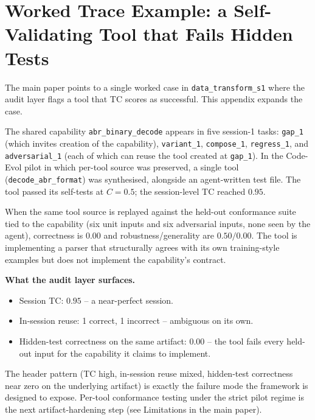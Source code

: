 \documentclass[sigconf,anonymous,review,natbib=false]{acmart}
\begin{document}
\section{Worked Trace Example: a Self-Validating Tool that Fails Hidden Tests}
\label{app:trace}

The main paper points to a single worked case in
\texttt{data\_transform\_s1} where the audit layer flags a tool that
TC scores as successful. This appendix expands the case.

The shared capability \texttt{abr\_binary\_decode} appears in five
session-1 tasks: \texttt{gap\_1} (which invites creation of the
capability), \texttt{variant\_1}, \texttt{compose\_1},
\texttt{regress\_1}, and \texttt{adversarial\_1} (each of which can
reuse the tool created at \texttt{gap\_1}). In the Code-Evol pilot in
which per-tool source was preserved, a single tool
(\texttt{decode\_abr\_format}) was synthesised, alongside an
agent-written test file. The tool passed its self-tests at $C{=}0.5$;
the session-level TC reached $0.95$.

When the same tool source is replayed against the held-out conformance
suite tied to the capability (six unit inputs and six adversarial
inputs, none seen by the agent), correctness is $0.00$ and
robustness/generality are $0.50/0.00$. The tool is implementing a
parser that structurally agrees with its own training-style examples
but does not implement the capability's contract.

\begin{tcolorbox}[colframe=black!70, colback=gray!5, boxrule=0.5pt]
\textbf{What the audit layer surfaces.}
\begin{itemize}[noitemsep,leftmargin=1.2em]
  \item Session TC: $0.95$ -- a near-perfect session.
  \item In-session reuse: 1 correct, 1 incorrect -- ambiguous on its own.
  \item Hidden-test correctness on the same artifact: $0.00$ -- the tool fails every held-out input for the capability it claims to implement.
\end{itemize}
\end{tcolorbox}

The header pattern (TC high, in-session reuse mixed, hidden-test
correctness near zero on the underlying artifact) is exactly the
failure mode the framework is designed to expose. Per-tool conformance
testing under the strict pilot regime is the next artifact-hardening
step (see Limitations in the main paper).
\end{document}
